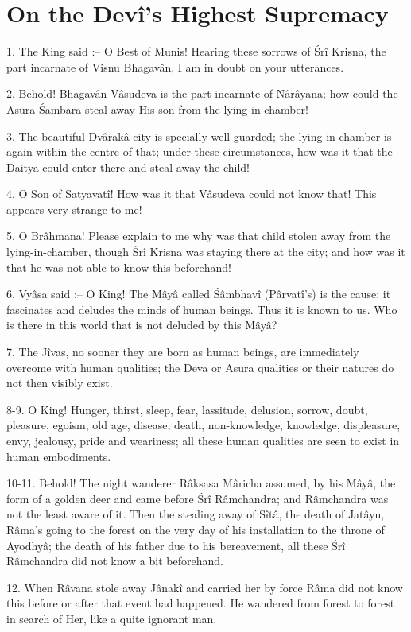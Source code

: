 ﻿\chapter{On the Dev\^i's Highest Supremacy}

1. The King said :-- O Best of Munis! Hearing these sorrows of \'Sr\^i Krisna, the part incarnate of Visnu Bhagav\^an, I am in doubt on your utterances.

2. Behold! Bhagav\^an V\^asudeva is the part incarnate of N\^ar\^ayana; how could the Asura \'Sambara steal away His son from the lying-in-chamber!

3. The beautiful Dv\^arak\^a city is specially well-guarded; the lying-in-chamber is again within the centre of that; under these circumstances, how was it that the Daitya could enter there and steal away the child!

4. O Son of Satyavat\^i! How was it that V\^asudeva could not know that! This appears very strange to me!

5. O Br\^ahmana! Please explain to me why was that child stolen away from the lying-in-chamber, though \'Sr\^i Krisna was staying there at the city; and how was it that he was not able to know this beforehand!

6. Vy\^asa said :-- O King! The M\^ay\^a called \'S\^ambhav\^i (P\^arvat\^i's) is the cause; it fascinates and deludes the minds of human beings. Thus it is known to us. Who is there in this world that is not deluded by this M\^ay\^a?

7. The J\^ivas, no sooner they are born as human beings, are immediately overcome with human qualities; the Deva or Asura qualities or their natures do not then visibly exist.

8-9. O King! Hunger, thirst, sleep, fear, lassitude, delusion, sorrow, doubt, pleasure, egoism, old age, disease, death, non-knowledge, knowledge, displeasure, envy, jealousy, pride and weariness; all these human qualities are seen to exist in human embodiments.

10-11. Behold! The night wanderer R\^aksasa M\^aricha assumed, by his M\^ay\^a, the form of a golden deer and came before \'Sr\^i R\^amchandra; and R\^amchandra was not the least aware of it. Then the stealing away of S\^it\^a, the death of Jat\^ayu, R\^ama's going to the forest on the very day of his installation to the throne of Ayodhy\^a; the death of his father due to his bereavement, all these \'Sr\^i R\^amchandra did not know a bit beforehand.

12. When R\^avana stole away J\^anak\^i and carried her by force R\^ama did not know this before or after that event had happened. He wandered from forest to forest in search of Her, like a quite ignorant man.

